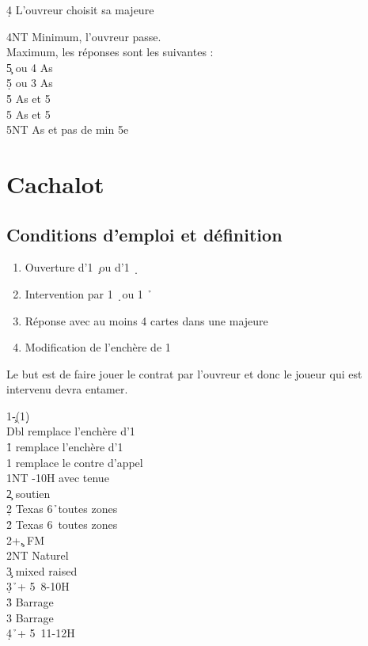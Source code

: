 \documentclass[a4paper]{article}
\begin{document}
\begin{bidtable}
4\d \> L'ouvreur choisit sa majeure
\end{bidtable}

\begin{bidtable}
4NT \> Minimum, l'ouvreur passe.\\
\>Maximum, les réponses sont les suivantes :\+\\
5\c {} ou 4 As\\
5\d {} ou 3 As\\
5\h {} As et 5\c \\
5\s {} As et 5\d \\
5NT  As et pas de min 5e\-
\end{bidtable}

\section{Cachalot}

\subsection{Conditions d'emploi et définition}

\begin{enumerate}
\item Ouverture d’1 \c\ ou d’1 \d\ 

\item Intervention par 1 \d\ ou 1 \h\ 

\item Réponse avec au moins 4 cartes dans une majeure

\item Modification de l’enchère de 1 \s 

\end{enumerate}

Le but est de faire jouer le contrat par l’ouvreur et donc le joueur 
qui est intervenu devra entamer.

\begin{bidtable}
1\c-(1\d)\\
Dbl \> remplace l'enchère d'1\h \\
1\h \> remplace l'enchère d'1\s \\
1\s \> remplace le contre d'appel\\
1NT -10H avec tenue\\
2\c \> soutien \c \\
2\d \> Texas 6\h\ toutes zones\\
2\h \> Texas 6\s\ toutes zones\\
2\s {}+\c , FM\\
2NT \> Naturel\\
3\c \> mixed raised \c \\
3\d {}\h\ + 5\s\ 8-10H\\
3\h \> Barrage \h \\
3\s \> Barrage \s \\
4\d {}\h\ + 5\s\ 11-12H
\end{bidtable}
\end{document}
